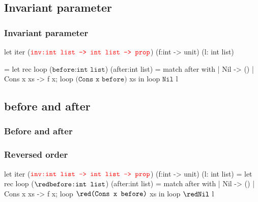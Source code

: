 \documentclass[xcolor=dvipsnames]{beamer}
\begin{document}
\subsection*{Invariant parameter}
\begin{frame}[fragile]
\frametitle{Invariant parameter}
\hspace*{-1em}
\begin{whycode}
let iter ($\textcolor{red}{\texttt{inv:int list -> int list -> prop}}$) 
(f:int -> unit) (l: int list)
\end{whycode}\vspace*{-1em}\begin{whygray} 
= let rec loop (${ \texttt{before:int list}}$) (after:int list)
  = match after with
     | Nil       -> ()
     | Cons x xs -> f x; loop ${ \texttt{(Cons x before)}}$ xs
  in loop ${\texttt{Nil}}$ l
\end{whygray}
\end{frame}
\addtocounter{framenumber}{-1}

\subsection*{before and after}
\begin{frame}[fragile]
\frametitle<1>{Before and after}
\frametitle<2->{Reversed order}
\hspace*{-1em}
\begin{whycode}
let iter ($\textcolor{red}{\texttt{inv:int list -> int list -> prop}}$) 
(f:int -> unit) (l: int list)
= let rec loop (${\red \texttt{before:int list}}$) (after:int list)
  = match after with
     | Nil       -> ()
     | Cons x xs -> f x; loop ${\red \texttt{(Cons x before)}}$ xs
  in loop ${\red\texttt{Nil}}$ l
\end{whycode}

%
\end{frame}
\addtocounter{framenumber}{-1}
\end{document}
